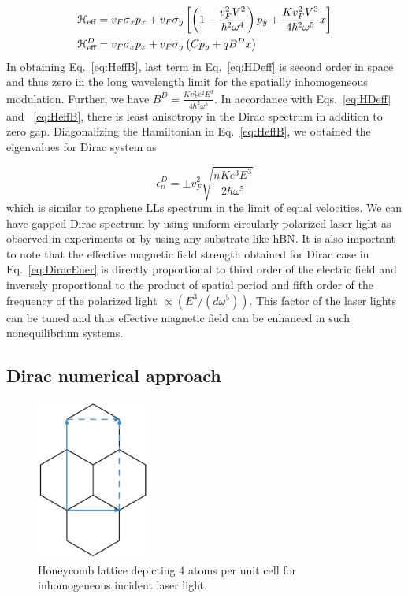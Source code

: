\begin{align} \label{eq:HeffB}
  \mathcal{H}_{\text{eff}} &= v_F \sigma_x p_x + v_F \sigma_y \left[ \left( 1- \dfrac{v_F^2V^2}{\hbar^2\omega^4} \right) p_y + \dfrac{K v_F^2 V^3}{4 \hbar^2 \omega^5} x \right] \nonumber \\
  \mathcal{H}_{\text{eff}}^D &= v_{F}\sigma_{x}p_{x}+v_F\sigma_{y} \left( C p_{y} + qB^Dx \right)
\end{align}%
In obtaining Eq.~\eqref{eq:HeffB}, last term in Eq.~\eqref{eq:HDeff} is second order in space and thus zero in the long wavelength limit for the spatially inhomogeneous modulation.
Further, we have $B^D=\frac{Kv_F^2 e^2E^3}{4\hbar^{2}\omega^{5}}$.
In accordance with Eqs.~\eqref{eq:HDeff} and ~\eqref{eq:HeffB}, there is least anisotropy in the Dirac spectrum in addition to zero gap.
Diagonalizing the Hamiltonian in Eq.~\eqref{eq:HeffB}, we obtained the eigenvalues for Dirac system as%

\begin{equation} \label{eq:DiracEner}
  \epsilon_{n}^D = \pm v_F^2 \sqrt{\dfrac{nK e^3 E^3}{2 \hbar \omega^5}}
\end{equation}
which is similar to graphene LLs spectrum in the limit of equal velocities.
We can have gapped Dirac spectrum by using uniform circularly polarized laser light as observed in experiments \cite{YHW, JWM} or by using any substrate like hBN.
It is also important to note that the effective magnetic field strength obtained for Dirac case in Eq.~\eqref{eq:DiracEner} is directly proportional to third order of the electric field and inversely proportional to the product of spatial period and fifth order of the frequency of the polarized light $\propto (E^3/(d\omega^5))$.
This factor of the laser lights can be tuned and thus effective magnetic field can be enhanced in such nonequilibrium systems.

\subsection{Dirac numerical approach}

\begin{figure}[h]
  \includegraphics[width=0.33\textwidth]{./figures/dirac-floquet-unit-cell.pdf}
  \caption{Honeycomb lattice depicting 4 atoms per unit cell for inhomogeneous incident laser light.}
  \label{fig:honeycomb}
\end{figure}

